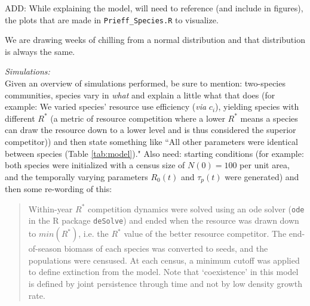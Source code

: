 \documentclass[11pt,letter]{article}
\begin{document}
ADD: While explaining the model, will need to reference (and include in figures), the plots that are made in \verb|Prieff_Species.R| to visualize. 

We are drawing weeks of chilling from a normal distribution and that distribution is always the same. 

\noindent \emph{Simulations:}\\
Given an overview of simulations performed, be sure to mention: two-species communities, species vary in \emph{what} and explain a little what that does (for example: We varied species' resource use efficiency (\emph{via} $c_i$), yielding species with different $R^*$ (a metric of resource competition where a lower $R^*$ means a species can draw the resource down to a lower level and is thus considered the superior competitor)) and then state something like ``All other parameters were identical between species (Table \ref{tab:model})." Also need: starting conditions (for example: both species were initialized with a census size of $N(0) = 100$ per unit area, and the temporally varying parameters $R_0(t)$ and $\tau_{p}(t)$ were generated) and then some re-wording of this:
\begin{quote}
Within-year $R^{*}$ competition dynamics were solved using an ode solver (\verb|ode| in the R package \verb|deSolve|) and ended when the resource was drawn down to $min(R^{*})$, i.e. the $R^{*}$ value of the better resource competitor.  The end-of-season biomass of each species was converted to seeds, and the populations were censused.  At each census, a minimum cutoff was applied to define extinction from the model.  Note that `coexistence' in this model is defined by joint persistence through time and not by low density growth rate. 
\end{quote}
\end{document}
